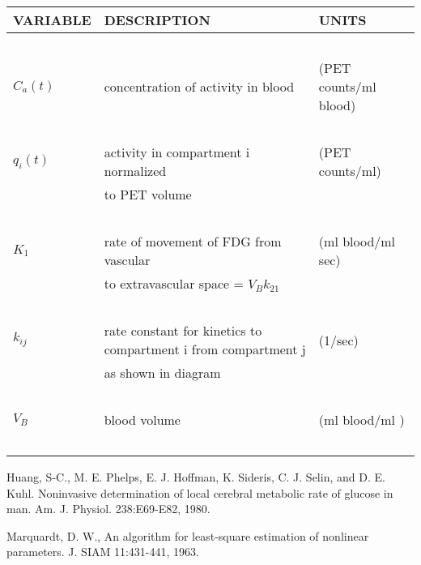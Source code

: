 \documentclass[11pt]{article}    %
\begin{document}
\vspace {0.35in}
\begin{center}

\begin{tabular}{|l|l|l|}
\hline
  VARIABLE  &  DESCRIPTION   & UNITS \\
\hline
\     &   &  \\
\(C_{a}(t)\) & concentration of activity in blood & (PET counts/ml blood)\\
\      &  &   \\
\(q_{i}(t)\)  &  activity in compartment i normalized 
  & (PET counts/ml) \\
    & to PET volume &  \\
\  &  &   \\
\(K_{1}\) & rate of movement of FDG from vascular & (ml blood/ml sec)\\
    &  to extravascular space  = $V_{B}k_{21}$ &   \\
\     &    &   \\
\(k_{ij}\) &  rate constant for kinetics to compartment i from compartment j   & (1/sec) \\
    &  as shown in diagram &  \\
\   &   &  \\
\(V_{B} \) & blood volume & (ml blood/ml ) \\
\  &   &    \\
\hline
\end {tabular}
\end {center}

\begin{thebibliography}{2}
\bibitem{[1]}
  Huang, S-C., M. E. Phelps, E. J. Hoffman, K. Sideris, C. J. Selin, and
   D. E. Kuhl.
  Noninvasive determination of local cerebral metabolic
   rate of glucose in man. 
  Am. J. Physiol. 238:E69-E82, 1980.
\bibitem{[2]}

   Marquardt, D. W., An algorithm for least-square estimation of 
     nonlinear parameters. J.  SIAM 11:431-441, 1963.
\end{thebibliography}

\newpage
\end{document}
